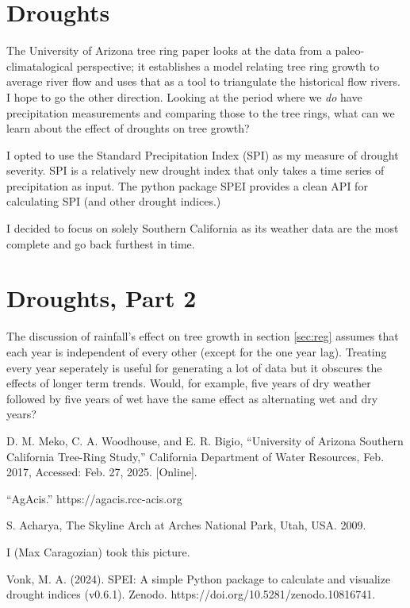 \documentclass[]{article}
\begin{document}
\section{Droughts}
The University of Arizona tree ring paper \cite{tree_study} looks at the data from a paleo-climatalogical perspective; it establishes a model relating tree ring growth to average river flow and uses that as a tool to  triangulate the historical flow rivers. I hope to go the other direction. Looking at the period where we \textit{do} have precipitation measurements and comparing those to the tree rings, what can we learn about the effect of droughts on tree growth?

I opted to use the Standard Precipitation Index (SPI) as my measure of drought severity. SPI is a relatively new drought index that only takes a time series of precipitation as input. The python package SPEI\cite{spei} provides a clean API for calculating SPI (and other drought indices.)

I decided to focus on solely Southern California as its weather data are the most complete and go back furthest in time. 






\section{Droughts, Part 2}
The discussion of rainfall's effect on tree growth in section \ref{sec:reg} assumes that each year is independent of every other (except for the one year lag). Treating every year seperately is useful for generating a lot of data but it obscures the effects of longer term trends. Would, for example, five years of dry weather followed by five years of wet have the same effect as alternating wet and dry years? 


\begin{thebibliography}{9}
	D. M. Meko, C. A. Woodhouse, and E. R. Bigio, “University of Arizona
	Southern California Tree-Ring Study,” California Department of Water Resources, Feb. 2017, Accessed: Feb. 27, 2025. [Online].
	
	“AgAcis.” https://agacis.rcc-acis.org
	
	S. Acharya, The Skyline Arch at Arches National Park, Utah, USA. 2009.
	
	I (Max Caragozian) took this picture.
	
	Vonk, M. A. (2024). SPEI: A simple Python package to calculate and visualize drought indices (v0.6.1). Zenodo. https://doi.org/10.5281/zenodo.10816741.
\end{thebibliography}
\end{document}

